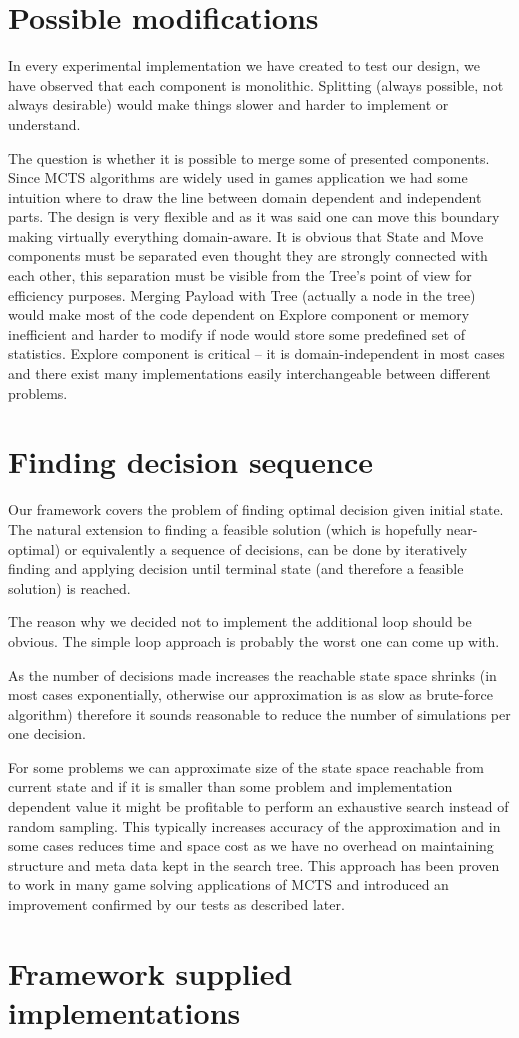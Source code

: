 \section{Possible modifications}
In every experimental implementation we have created to test our design, we
have observed that each component is monolithic. Splitting (always possible,
not always desirable) would make things slower and harder to implement or
understand.

The question is whether it is possible to merge some of presented components.
Since MCTS algorithms are widely used in games application we had some
intuition where to draw the line between domain dependent and independent
parts. The design is very flexible and as it was said one can move this
boundary making virtually everything domain-aware. It is obvious that State
and Move components must be separated even thought they are strongly connected
with each other, this separation must be visible from the Tree's point of view
for efficiency purposes.
Merging Payload with Tree (actually a node in the tree) would make most of the
code dependent on Explore component or memory inefficient and harder to modify
if node would store some predefined set of statistics.
Explore component is critical -- it is domain-independent in most cases and
there exist many implementations easily interchangeable between different
problems.

\section{Finding decision sequence}
Our framework covers the problem of finding optimal decision given initial
state. The natural extension to finding a feasible solution (which is hopefully
near-optimal) or equivalently a sequence of decisions, can be done by
iteratively finding and applying decision until terminal state (and therefore a
feasible solution) is reached.

The reason why we decided not to implement the additional loop should be
obvious. The simple loop approach is probably the worst one can come up with.

As the number of decisions made increases the reachable state space shrinks (in
most cases exponentially, otherwise our approximation is as slow as brute-force
algorithm) therefore it sounds reasonable to reduce the number of simulations
per one decision.

For some problems we can approximate size of the state space reachable from
current state and if it is smaller than some problem and implementation
dependent value it might be profitable to perform an exhaustive search instead
of random sampling. This typically increases accuracy of the approximation and
in some cases reduces time and space cost as we have no overhead on maintaining
structure and meta data kept in the search tree. This approach has been proven
to work in many game solving applications of MCTS and introduced an improvement
confirmed by our tests as described later.

\section{Framework supplied implementations}

